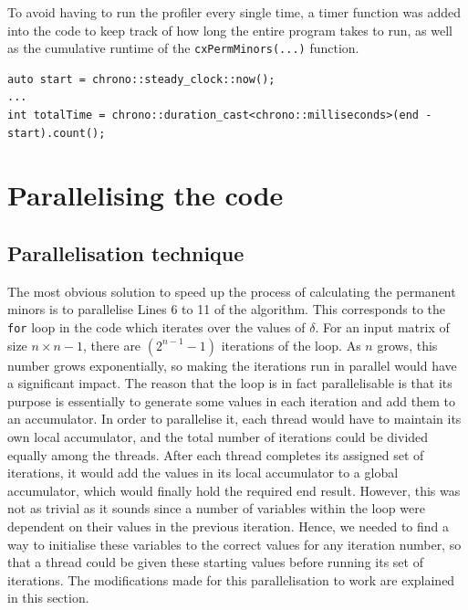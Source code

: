 \documentclass[ %
                    author={Manan Vaswani},
                supervisor={Dr. Raphael Clifford},
                    degree={MEng},
                     title={A multi-core CPU implementation of the classical Boson Sampling algorithm},
                  subtitle={},
                      type={},
                      year={2019} ]{dissertation}
\theoremstyle{plain}
\theoremstyle{definition}
\begin{document}
To avoid having to run the profiler every single time, a timer function was added into the code to keep track of how long the entire program takes to run, as well as the cumulative runtime of the \texttt{cxPermMinors(...)} function.
\begin{verbatim}
auto start = chrono::steady_clock::now();
... 
int totalTime = chrono::duration_cast<chrono::milliseconds>(end - start).count();
\end{verbatim}

\section{Parallelising the code}
\subsection{Parallelisation technique}
The most obvious solution to speed up the process of calculating the permanent minors is to parallelise Lines 6 to 11 of the algorithm. This corresponds to the \texttt{for} loop in the code which iterates over the values of $\delta$. For an input matrix of size $n \times n-1$, there are $(2^{n-1} -1)$ iterations of the loop. As $n$ grows, this number grows exponentially, so making the iterations run in parallel would have a significant impact. The reason that the loop is in fact parallelisable is that its purpose is essentially to generate some values in each iteration and add them to an accumulator. In order to parallelise it, each thread would have to maintain its own local accumulator, and the total number of iterations could be divided equally among the threads. After each thread completes its assigned set of iterations, it would add the values in its local accumulator to a global accumulator, which would finally hold the required end result. However, this was not as trivial as it sounds since a number of variables within the loop were dependent on their values in the previous iteration. Hence, we needed to find a way to initialise these variables to the correct values for any iteration number, so that a thread could be given these starting values before running its set of iterations. The modifications made for this parallelisation to work are explained in this section.
\end{document}
